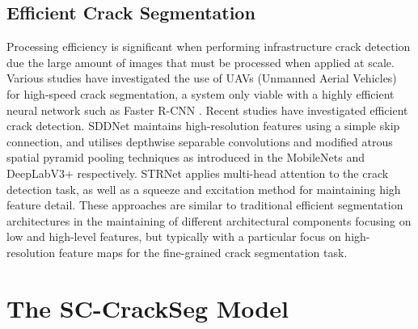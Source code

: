 \documentclass[a4paper,12pt]{report}
\begin{document}
\subsection{Efficient Crack Segmentation}
Processing efficiency is significant when performing infrastructure crack detection due the large amount of images that must be processed when applied at scale. Various studies \cite{kerle_uav-based_2020} \cite{kang_autonomous_2018} have investigated the use of UAVs (Unmanned Aerial Vehicles) for high-speed crack segmentation, a system only viable with a highly efficient neural network such as Faster R-CNN \cite{ali_real-time_2021}. Recent studies have investigated efficient crack detection. SDDNet \cite{choi_sddnet_2019} maintains high-resolution features using a simple skip connection, and utilises depthwise separable convolutions and modified atrous spatial pyramid pooling techniques as introduced in the MobileNets \cite{howard_mobilenets_2017} and DeepLabV3+ \cite{chen_rethinking_2017} respectively. STRNet \cite{kang_efficient_2021} applies multi-head attention to the crack detection task, as well as a squeeze and excitation method for maintaining high feature detail.
These approaches are similar to traditional efficient segmentation architectures in the maintaining of different architectural components focusing on low and high-level features, but typically with a particular focus on high-resolution feature maps for the fine-grained crack segmentation task.

\section{The SC-CrackSeg Model}


\end{document}

